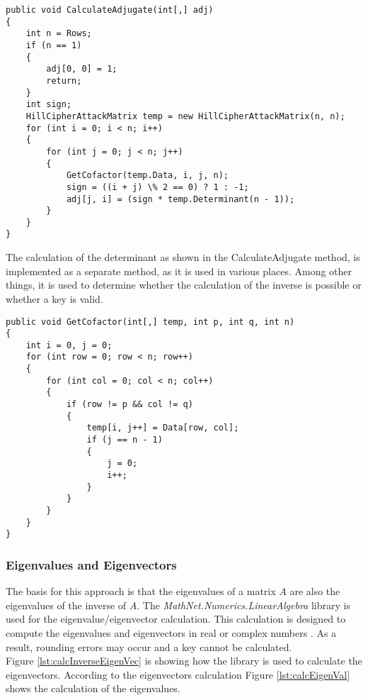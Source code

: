 \documentclass[conference]{IEEEtran}
\begin{document}
\begin{lstlisting}[caption={CalculateAdjugate method}, label={lst:calcAdj}]
public void CalculateAdjugate(int[,] adj)
{
    int n = Rows;
    if (n == 1)
    {
        adj[0, 0] = 1;
        return;
    }
    int sign;
    HillCipherAttackMatrix temp = new HillCipherAttackMatrix(n, n);
    for (int i = 0; i < n; i++)
    {
        for (int j = 0; j < n; j++)
        {
            GetCofactor(temp.Data, i, j, n);
            sign = ((i + j) \% 2 == 0) ? 1 : -1;
            adj[j, i] = (sign * temp.Determinant(n - 1));
        }
    }
}
\end{lstlisting}

The calculation of the determinant as shown in the CalculateAdjugate method, is implemented as a separate method, as it is used in various places. Among other things, it is used to determine whether the calculation of the inverse is possible or whether a key is valid.

\begin{lstlisting}[caption={GetCofactor method}, label={lst:calcCofa}]
public void GetCofactor(int[,] temp, int p, int q, int n)
{
    int i = 0, j = 0;
    for (int row = 0; row < n; row++)
    {
        for (int col = 0; col < n; col++)
        {
            if (row != p && col != q)
            {
                temp[i, j++] = Data[row, col];
                if (j == n - 1)
                {
                    j = 0;
                    i++;
                }
            }
        }
    }
}
\end{lstlisting}

\subsubsection{Eigenvalues and Eigenvectors}
The basis for this approach is that the eigenvalues of a matrix \(A\) are also the eigenvalues of the inverse of \(A\). The \textit{MathNet.Numerics.LinearAlgebra} library is used for the eigenvalue/eigenvector calculation. This calculation is designed to compute the eigenvalues and eigenvectors in real or complex numbers \cite{b3}. As a result, rounding errors may occur and a key cannot be calculated.
\\
Figure \ref{lst:calcInverseEigenVec} is showing how the library is used to calculate the eigenvectors. According to the eigenvectors calculation Figure \ref{lst:calcEigenVal} shows the calculation of the eigenvalues.
\end{document}
